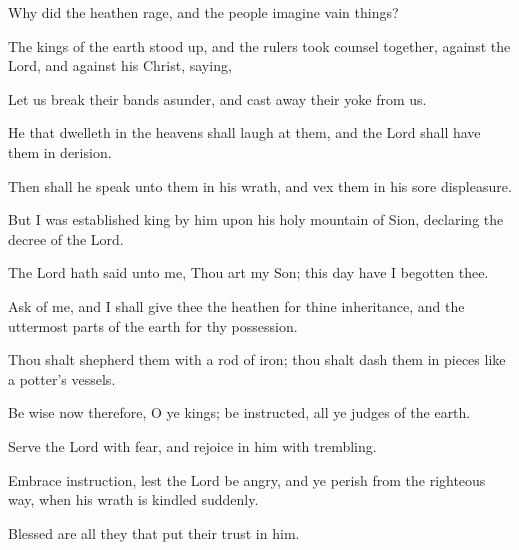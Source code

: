 Why did the heathen rage, and the people imagine vain things?

The kings of the earth stood up, and the rulers took counsel together, against the Lord, and against his Christ, saying,

Let us break their bands asunder, and cast away their yoke from us.

He that dwelleth in the heavens shall laugh at them, and the Lord shall have them in derision.

Then shall he speak unto them in his wrath, and vex them in his sore displeasure.

But I was established king by him upon his holy mountain of Sion, declaring the decree of the Lord.

The Lord hath said unto me, Thou art my Son; this day have I begotten thee.

Ask of me, and I shall give thee the heathen for thine
inheritance, and the uttermost parts of the earth for thy possession.

Thou shalt shepherd them with a rod of iron; thou shalt dash them in pieces like a potter's vessels.

Be wise now therefore, O ye kings; be instructed, all ye judges of the earth.

Serve the Lord with fear, and rejoice in him with trembling.

Embrace instruction, lest the Lord be angry, and ye perish from the righteous way, when his wrath is kindled suddenly.

Blessed are all they that put their trust in him.
